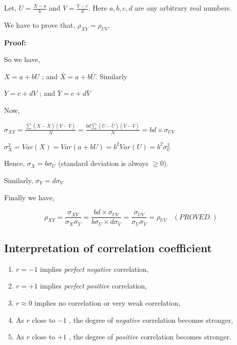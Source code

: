 \documentclass[
  11pt,
  letterpaper,
  DIV=11,
  numbers=noendperiod]{scrreprt}
\begin{document}
\begin{tcolorbox}[enhanced jigsaw, bottomrule=.15mm, toprule=.15mm, title=\textcolor{quarto-callout-note-color}{\faInfo}\hspace{0.5em}{Effect of change of origin and scale on \(\rho\)}, bottomtitle=1mm, colframe=quarto-callout-note-color-frame, coltitle=black, rightrule=.15mm, toptitle=1mm, colbacktitle=quarto-callout-note-color!10!white, titlerule=0mm, breakable, arc=.35mm, leftrule=.75mm, opacitybacktitle=0.6, opacityback=0, colback=white, left=2mm]

Let, \(U=\frac{X-a}{b}\) and \(V=\frac{Y-c}{d}\). Here \(a,b,c,d\) are
any arbitrary real numbers.

We have to prove that, \(\rho_{XY}=\rho_{UV}\).

\textbf{Proof:}

So we have,

\(X=a+bU\) ; and \(\bar X =a+b \bar U\). Similarly

\(Y=c+dV\) ; and \(\bar Y=c+d \bar V\)

Now,

\(\sigma_{XY}=\frac {\sum(X-\bar X)(Y-\bar Y)}{N}=\frac{bd\sum(U-\bar U)(V-\bar V)}{N}=bd\times \sigma_{UV}\)

\(\sigma_X^2=Var(X)=Var(a+bU)=b^2 Var(U)=b^2 \sigma^2_U\)

Hence, \(\sigma_X=b\sigma_U\) (standard deviation is always \(\ge0\)).

Similarly, \(\sigma_Y=d\sigma_V\)

Finally we have,

\[\rho_{XY}=\frac{\sigma_{XY}}{\sigma_X \sigma_Y}=\frac{bd\times \sigma_{UV}}{b\sigma_U \times d\sigma_V}=\frac{\sigma_{UV}}{\sigma_U \sigma_V}=\rho_{UV} \ \ \ \  (PROVED.)\]

\end{tcolorbox}

\subsection{Interpretation of correlation
coefficient}\label{interpretation-of-correlation-coefficient}

\begin{enumerate}
\def\labelenumi{(\alph{enumi})}
\item
  \(r=-1\) implies \emph{perfect negative} correlation,
\item
  \(r=+1\) implies \emph{perfect positive} correlation,
\item
  \(r\approx 0\) implies no correlation or very weak correlation,
\item
  As \(r\) close to \(-1\) , the degree of \emph{negative} correlation
  becomes stronger,
\item
  As \(r\) close to \(+1\) , the degree of \emph{positive} correlation
  becomes stronger.
\end{enumerate}
\end{document}
